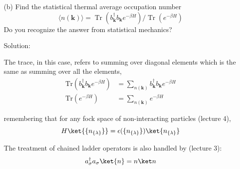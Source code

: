 \begin{homeworkProblem}
\begin{itemize}
\begin{callout}{Solution:}
                For any fock space of non-interacting particles,
                $$H\ket{ \{ n_{\{ \lambda \}} \}} =E(\{ n_{\{ \lambda \}} \})\ket{n_{\{ \lambda \}}} $$

                Where $E(\{ n_{\{ \lambda \}} \})$ is the total energy, and is described by a sum over single particle energies:
                $$E(\{ n_{\{ \lambda \}} \}) = \sum_{\{ \lambda \}}\epsilon_{\{ \lambda \}}n_{\{ \lambda \}}$$

                So for this case we're taking $\epsilon_{\mathbf{k}}$ to be for plane waves whic makes total energy a sum 
                \begin{align*}
                    E(\{ n_{\mathbf{k}} \}) = \sum_{\mathbf{k}} \frac{\hbar^{2}k^{2}}{2m} n(\mathbf{k})
                \end{align*}

            \end{callout}

        \newpage
        \item[(b)] Find the statistical thermal average occupation number
            $$ \langle n(\mathbf{k})\rangle=\operatorname{Tr}\left(b_{\mathbf{k}}^{\dagger} b_{\mathbf{k}} e^{-\beta H}\right) / \operatorname{Tr}\left(e^{-\beta H}\right) $$
            Do you recognize the answer from statistical mechanics?
            \begin{callout}{Solution:}

                The trace, in this case, refers to summing over diagonal elements which is the same as summing over all the elements,
                \begin{align*}
                    \text{Tr} \left( b_{\mathbf k}^{\dagger} b_{\mathbf k} e^{-\beta H} \right) &= \sum_{n(\mathbf{k})} b_{\mathbf k}^{\dagger} b_{\mathbf k} e^{-\beta H} \\
                    \text{Tr} \left( e^{-\beta H} \right) &= \sum_{n(\mathbf{k})} e^{-\beta H}
                \end{align*}

                remembering that for any fock space of non-interacting particles (lecture 4),
                $$H\ket{ \{ n_{\{ \lambda \}} \}} =\epsilon(\{ n_{\{ \lambda \}} \})\ket{n_{\{ \lambda \}}} $$

                The treatment of chained ladder operators is also handled by (lecture 3):
                \begin{align*}
                    a_{\sigma}^{\dagger}a_{\sigma}\ket{n} = n\ket n
                \end{align*}


\end{callout}
\end{itemize}
\end{homeworkProblem}
